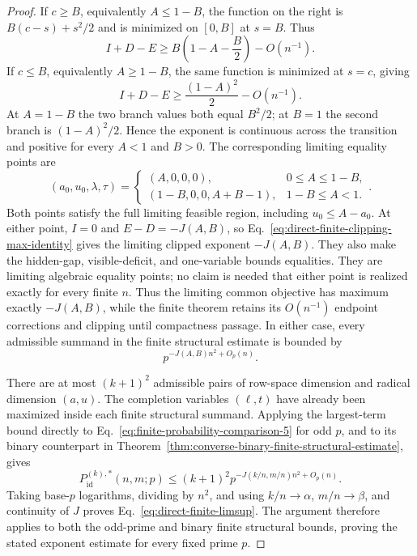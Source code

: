 \documentclass[11pt]{article}
\newcommand{\1}{\mathbf 1}
\theoremstyle{plain}
\theoremstyle{definition}
\theoremstyle{remark}
\begin{document}
\begin{proof}
If $c\ge B$, equivalently $A\le1-B$, the function on the right is
$B(c-s)+s^2/2$ and is minimized on $[0,B]$ at $s=B$.  Thus
\begin{equation}
 I+D-E\ge B\left(1-A-\frac B2\right)-O(n^{-1}).
 \label{eq:direct-finite-case-one}
\end{equation}
If $c\le B$, equivalently $A\ge1-B$, the same function is minimized at
$s=c$, giving
\begin{equation}
 I+D-E\ge\frac{(1-A)^2}{2}-O(n^{-1}).
 \label{eq:direct-finite-case-two}
\end{equation}
At $A=1-B$ the two branch values both equal $B^2/2$; at $B=1$ the
second branch is $(1-A)^2/2$.  Hence the exponent is continuous across the
transition and positive for every $A<1$ and $B>0$.
The corresponding limiting equality points are
\begin{equation}
 (a_0,u_0,\lambda,\tau)=
 \begin{cases}
  (A,0,0,0),&0\le A\le1-B,\\[1mm]
  (1-B,0,0,A+B-1),&1-B\le A<1.
 \end{cases}.
 \label{eq:direct-finite-limiting-equality-points}
\end{equation}
Both points satisfy the full limiting feasible region, including
$u_0\le A-a_0$.  At either point, $I=0$ and $E-D=-J(A,B)$, so
Eq.~\eqref{eq:direct-finite-clipping-max-identity} gives the limiting clipped
exponent $-J(A,B)$.  They also make the hidden-gap, visible-deficit, and
one-variable bounds equalities.  They are limiting algebraic equality points;
no claim is needed that either point is realized exactly for every finite
$n$.  Thus the limiting common objective has
maximum exactly $-J(A,B)$, while the finite theorem retains its
$O(n^{-1})$ endpoint corrections and clipping until compactness passage.
In either case, every admissible summand in the finite structural estimate is
bounded by
\begin{equation}
 p^{-J(A,B)n^2+O_p(n)}.
 \label{eq:direct-finite-summand-bound}
\end{equation}

There are at most $(k+1)^2$ admissible pairs of row-space dimension and
radical dimension $(a,u)$.  The completion variables $(\ell,t)$ have already
been maximized inside each finite structural summand.  Applying the
largest-term bound directly to
Eq.~\eqref{eq:finite-probability-comparison-5} for odd $p$, and to its binary
counterpart in
Theorem~\ref{thm:converse-binary-finite-structural-estimate}, gives
\begin{equation}
 P_{\mathrm{id}}^{(k),*}(n,m;p)
 \le (k+1)^2 p^{-J(k/n,m/n)n^2+O_p(n)}.
 \label{eq:direct-finite-final-bound}
\end{equation}
Taking base-$p$ logarithms, dividing by $n^2$, and using
$k/n\to\alpha$, $m/n\to\beta$, and continuity of $J$ proves
Eq.~\eqref{eq:direct-finite-limsup}.
The argument therefore applies to both the odd-prime and binary finite
structural bounds, proving the stated exponent estimate for every fixed prime
$p$.
\end{proof}
\end{document}
